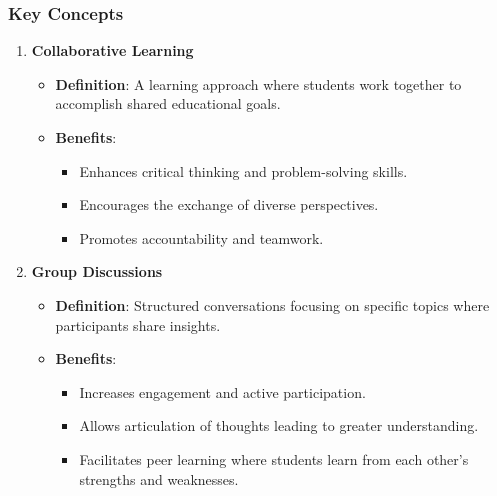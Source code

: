 \documentclass[aspectratio=169]{beamer}
\begin{document}
\begin{frame}[fragile]
    \frametitle{Key Concepts}
    \begin{enumerate}
        \item \textbf{Collaborative Learning}
        \begin{itemize}
            \item \textbf{Definition}: A learning approach where students work together to accomplish shared educational goals.
            \item \textbf{Benefits}:
            \begin{itemize}
                \item Enhances critical thinking and problem-solving skills.
                \item Encourages the exchange of diverse perspectives.
                \item Promotes accountability and teamwork.
            \end{itemize}
        \end{itemize}
        
        \item \textbf{Group Discussions}
        \begin{itemize}
            \item \textbf{Definition}: Structured conversations focusing on specific topics where participants share insights.
            \item \textbf{Benefits}:
            \begin{itemize}
                \item Increases engagement and active participation.
                \item Allows articulation of thoughts leading to greater understanding.
                \item Facilitates peer learning where students learn from each other’s strengths and weaknesses.
            \end{itemize}
        \end{itemize}
    \end{enumerate}
\end{frame}
\end{document}
